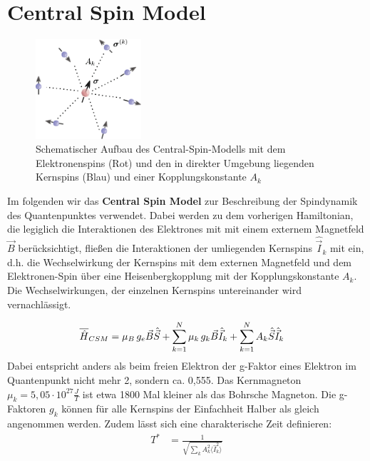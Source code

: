 \chapter{Central Spin Model}

\begin{figure}
    \centering
    \includegraphics[width = 0.35\textwidth]{Abbildungen/CSM_Schema.jpg}
    \caption{Schematischer Aufbau des Central-Spin-Modells mit dem Elektronenspins (Rot) und den in direkter Umgebung liegenden 
    Kernspins (Blau) und einer Kopplungskonstante $A_k$}
    \label{fig:CSM}
\end{figure}
Im folgenden wir das \textbf{Central Spin Model} zur Beschreibung der Spindynamik des Quantenpunktes verwendet. Dabei werden 
zu dem vorherigen Hamiltonian, die legiglich die Interaktionen des Elektrones mit mit einem externem Magnetfeld $\vec{B}$ berücksichtigt, 
fließen die Interaktionen der umliegenden Kernspins $\hat{\vec{I}}_k$ mit ein, d.h. die Wechselwirkung der Kernspins mit dem externen 
Magnetfeld und dem Elektronen-Spin über eine Heisenbergkopplung mit der Kopplungskonstante $A_k$. Die Wechselwirkungen, der einzelnen Kernspins 
untereinander wird vernachlässigt.

\begin{align}
    \overline{\hat{H}}_{CSM} &= \mu_B\thinspace g_e \vec{B}\hat{\vec{S}} +  \sum_{k=1}^{N}\mu_k\thinspace g_k\vec{B}\hat{\vec{I}}_k + \sum_{k=1}^{N} A_k \hat{\vec{S}}\hat{\vec{I}}_k
\end{align}
Dabei entspricht anders als beim freien Elektron der g-Faktor eines Elektron im Quantenpunkt nicht mehr 2, sondern ca. 0,555. %
Das Kernmagneton $\mu_k= 5,05 \cdot 10^{27} \frac{J}{T}$ ist etwa 1800 Mal kleiner als das Bohrsche Magneton.
Die g-Faktoren $g_k$ können für alle Kernspins der Einfachheit Halber als gleich angenommen werden. Zudem lässt sich eine charakterische Zeit
definieren:
\begin{align}
    T^* &= \frac{1}{\sqrt{\sum_k A_k^2\langle \hat{I}_k^2 \rangle}}
\end{align}

